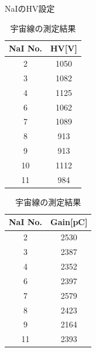 \begin{table}[H]
  \begin{minipage}[t]{0.45\textwidth}
    \begin{center}
    \caption{NaIのHV設定}\label{HV}
      \begin{tabular}{|c|c|}\hline
      NaI No.&HV[V]\\ \hline \hline
      2 & 1050 \\ \hline
      3 & 1082 \\ \hline
      4 & 1125 \\ \hline
      6 & 1062 \\ \hline
      7 & 1089 \\ \hline
      8 & 913 \\ \hline
      9 & 913 \\ \hline
      10 & 1112 \\ \hline
      11 & 984 \\ \hline
      \end{tabular}
    \end{center}
  \end{minipage}
  \hfill
  \begin{minipage}[t]{0.45\textwidth}
    \begin{center}
    \caption{宇宙線の測定結果}\label{nai_gain}
      \begin{tabular}{|c|c|}\hline
        NaI No. & Gain[pC]\\ \hline \hline
        2 & 2530 \\ \hline
        3 &2387 \\ \hline
        4 &2352 \\ \hline
        6 &2397 \\ \hline
        7  &2579 \\ \hline
        8  &2423 \\ \hline
        9  &2164 \\ \hline
        11  &2393 \\ \hline
      \end{tabular}
    \end{center}
  \end{minipage}
\end{table}

